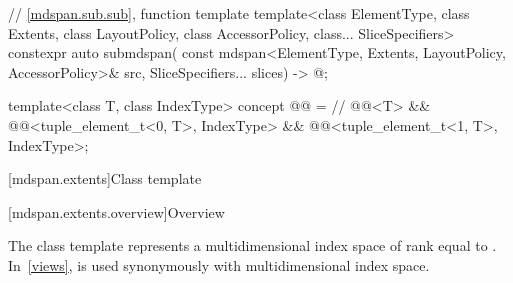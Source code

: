 \begin{codeblock}
{  // \ref{mdspan.sub.sub},  function template
  template<class ElementType, class Extents, class LayoutPolicy,
           class AccessorPolicy, class... SliceSpecifiers>
    constexpr auto submdspan(
      const mdspan<ElementType, Extents, LayoutPolicy, AccessorPolicy>& src,
      SliceSpecifiers... slices) -> @\seebelow@;

  template<class T, class IndexType>
    concept @@ =               // \expos
      @@<T> &&
      @@<tuple_element_t<0, T>, IndexType> &&
      @@<tuple_element_t<1, T>, IndexType>;
}
\end{codeblock}

[mdspan.extents]{Class template }

[mdspan.extents.overview]{Overview}

The class template  represents
a multidimensional index space of rank equal to .
In~\ref{views},
 is used synonymously with multidimensional index space.

